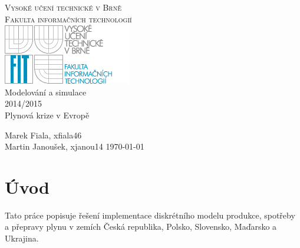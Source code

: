 \documentclass[a4paper,11pt]{article}
\begin{document}
\begin{center}
\Huge
\textsc{\LARGE Vysoké učení technické v Brně\\[-4.5mm] Fakulta informačních technologií}\\
\includegraphics{logo_fit.png}\\
{\LARGE Modelování a simulace\\[0mm]2014/2015}\\[2mm]
Plynová krize v Evropě\\
\end{center}
{\Large 
Marek Fiala, xfiala46\\
Martin Janoušek, xjanou14
\hfill
\today 
}

\thispagestyle{empty}
\newpage

\thispagestyle{empty}
\tableofcontents
\newpage


\section{Úvod} 




Tato práce popisuje řešení implementace diskrétního modelu produkce, spotřeby a přepravy plynu v zemích Česká republika, Polsko, Slovensko, Maďarsko a Ukrajina.
\end{document}

